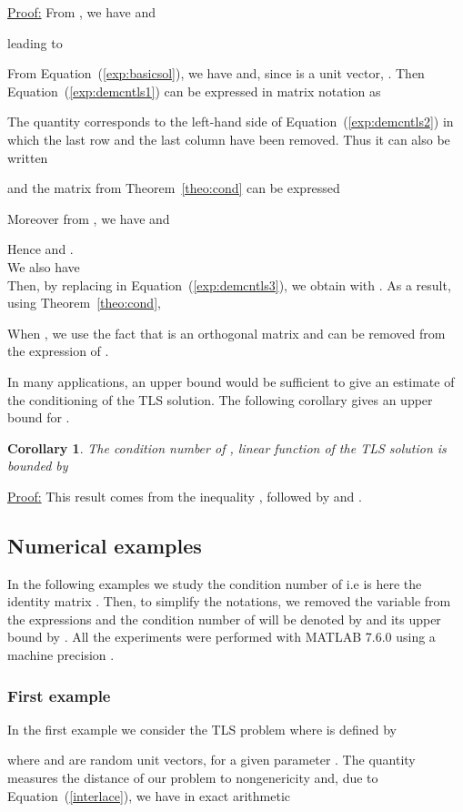 \documentclass[a4paper]{article}
\newcommand{\finproof}{\begin{flushright}  \end{flushright}}
\newtheorem{coro}{Corollary}
\begin{document}
{
\underline{Proof:}
From , we have
 and

leading to

From Equation~(\ref{exp:basicsol}), we have 
and, since  is a unit vector, .
Then Equation~(\ref{exp:demcntls1}) can be expressed in matrix notation as

The quantity 
corresponds to the left-hand side of Equation~(\ref{exp:demcntls2}) in which the last row and the last column have
been removed. Thus it can also be written

and the matrix  from Theorem~\ref{theo:cond} can be expressed

Moreover from , we have
 and

Hence  and
.\\
We also have \\
Then, by replacing in Equation~(\ref{exp:demcntls3}), we obtain
 with
.
As a result, using Theorem~\ref{theo:cond},

When , we use the fact that  is an orthogonal matrix and can be removed from the expression of
.
\finproof
In many applications, an upper bound would be sufficient to give an estimate of the conditioning of the TLS solution. The following corollary gives an upper bound for .
\begin{coro}
\label{coro:ubcntls}
The condition number of , linear function of the TLS solution is bounded by

\end{coro}
{
\underline{Proof:}
This result comes from the inequality
, followed by
 and
.
\finproof

\subsection{Numerical examples}
In the following examples we study the condition number of  i.e  is here the identity matrix .
Then, to simplify the notations, we removed the variable  from the expressions and the condition number of 
 will be denoted by  and its upper bound by .
All the experiments were performed with MATLAB 7.6.0 using a machine precision .
\subsubsection{First example}
In the first example we consider the TLS problem  where  is defined by

where  and  are random unit vectors,
 for a given parameter .
The quantity  measures the distance of our problem to
nongenericity and, due to Equation~(\ref{interlace}), we have in exact arithmetic

}}
\end{document}
